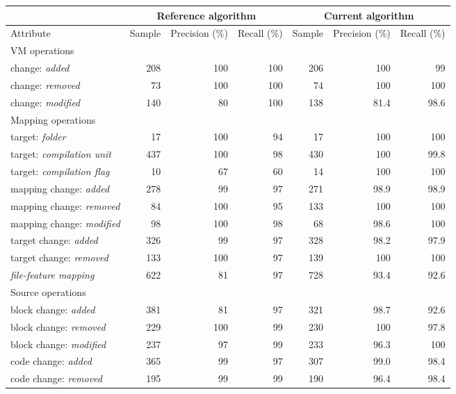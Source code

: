 \begin{table}[t]
\centering
\resizebox{\textwidth}{!}
{
\begin{tabular}{|l|r|r|r||r|r|r|}
\hline
& \multicolumn{3}{c|}{Reference algorithm \citep{dintzner_fever:_2016}} & \multicolumn{3}{c|}{Current algorithm} \\
\hline
Attribute & Sample & Precision (\%) & Recall (\%) & Sample & Precision (\%) & Recall (\%)\\
\hline
VM operations 							&  &  & & & & 					  		\\
change: \textit{added} 					&  208 & 100 & 100 & 206 & 100  & 99		\\
change: \textit{removed}					&  73  & 100 & 100 & 74  & 100  & 100	\\
change: \textit{modified}				&  140 & 80  & 100 & 138 & 81.4 & 98.6	\\
\hline
Mapping operations						&  &  & & & & 							\\
target: \textit{folder}					& 17 & 100 & 94 & 17 & 100 & 100			\\
target: \textit{compilation unit}		& 437 & 100 & 98  & 430 & 100 & 99.8		\\
target: \textit{compilation flag}		&  10 & 67 & 60 & 14 & 100  & 100		\\
mapping change: \textit{added}	    		& 278 & 99  & 97 & 271 & 98.9 & 98.9		\\
mapping change: \textit{removed}  		& 84 & 100 & 95 & 133 & 100 & 100		\\
mapping change: \textit{modified} 		& 98 & 100  & 98 & 68 & 98.6 & 100		\\
target change: \textit{added}			& 326 & 99  & 97 & 328 & 98.2 & 97.9		\\
target change: \textit{removed}			& 133 & 100 & 97 & 139 & 100 & 100		\\
\hline
\textit{file-feature mapping} 			& 622  & 81  & 97 & 728 & 93.4 & 92.6	\\
\hline
Source operations						&  &  & & & & \\
block change: \textit{added}				& 381 & 81 & 97 & 321 & 98.7 & 92.6 		\\
block change: \textit{removed}			& 229 & 100 & 99 & 230 & 100 & 97.8 		\\
block change: \textit{modified} 			& 237 & 97  & 99  & 233 & 96.3 & 100 	\\
code change: \textit{added}  			& 365 & 99  & 97  & 307 & 99.0 & 98.4 	\\
code change: \textit{removed}			& 195 & 99  & 99  & 190 & 96.4 & 98.4 	\\

\end{tabular}}
\end{table}

